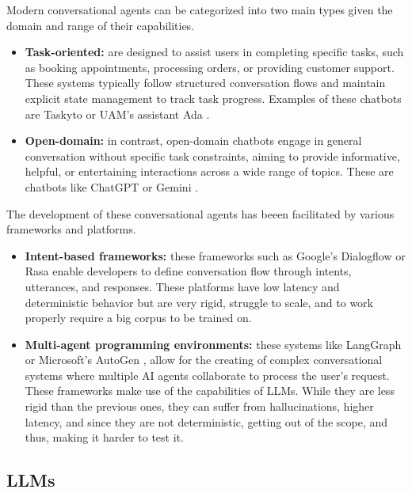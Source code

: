 Modern conversational agents can be categorized into two main types
given the domain and range of their capabilities.
\begin{itemize}
  \item \textbf{Task-oriented:}
    are designed to assist users in completing specific tasks,
    such as booking appointments, processing orders, or providing customer support.
  These systems typically follow structured conversation flows
and maintain explicit state management to track task progress.
  Examples of these chatbots are Taskyto \autocite{sanchezcuadradoAutomatingDevelopmentTaskoriented2024} or UAM's assistant Ada \autocite{AdaUAM}.

  \item \textbf{Open-domain:}
  in contrast, open-domain chatbots
  engage in general conversation without specific task constraints,
  aiming to provide informative, helpful, or entertaining interactions across a wide range of topics.
  These are chatbots like ChatGPT \autocite{ChatGPT} or Gemini \autocite{GoogleGemini}.
\end{itemize}

The development of these conversational agents
has beeen facilitated by various frameworks and platforms.
\begin{itemize}
  \item \textbf{Intent-based frameworks:}
    these frameworks such as Google's Dialogflow \autocite{Dialogflow} or Rasa \autocite{Rasa2020}
    enable developers to define conversation flow through intents, utterances, and responses.
    These platforms have low latency and deterministic behavior
    but are very rigid, struggle to scale,
    and to work properly require a big corpus to be trained on.

  \item \textbf{Multi-agent programming environments:}
    these systems like LangGraph \autocite{LangGraph} or Microsoft's AutoGen \autocite{AutoGen},
    allow for the creating of complex conversational systems
    where multiple \ac{AI} agents collaborate to process the user's request.
    These frameworks make use of the capabilities of \acp{LLM}.
    While they are less rigid than the previous ones,
    they can suffer from hallucinations, 
    higher latency, and since they are not deterministic,
    getting out of the scope, and thus, making it harder to test it.
\end{itemize}

\subsection{\aclp{LLM}}

